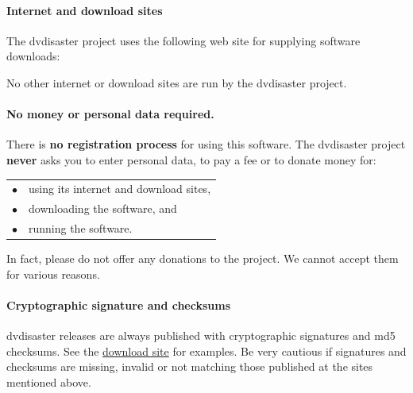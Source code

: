 \paragraph{Internet and download sites}\quad

\smallskip

The dvdisaster project uses the following web site for supplying software downloads:

\begin{center}
  \homepage
\end{center}

No other internet or download sites are run by the dvdisaster project.

\paragraph{No money or personal data required.}\quad

\smallskip

There is {\bf no registration process} for using this software.
The dvdisaster project {\bf never} asks you to enter personal data,
to pay a fee or to donate money for:

\smallskip

\begin{tabular}{ll}
$\bullet$ & using its internet and download sites,\\
$\bullet$ & downloading the software, and\\
$\bullet$ & running the software. \\
\end{tabular}

\smallskip

In fact, please do not offer any donations to the project. 
We cannot accept them for various reasons.

\paragraph{Cryptographic signature and checksums}\quad
\smallskip

dvdisaster releases are always published with cryptographic signatures
and md5 checksums. See the \href{http://dvdisaster.net}{download site} for examples.
Be very cautious if signatures and checksums are missing, invalid or not
matching those published at the sites mentioned above.
